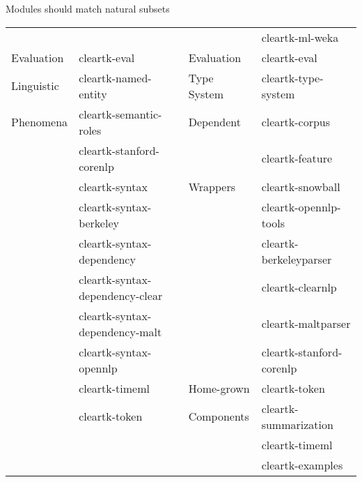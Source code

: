 \documentclass[final]{beamer}
\begin{document}
\begin{frame}[fragile]
\begin{columns}[t]
\begin{column}{.45\linewidth}
\begin{block}{Modules should match natural subsets}
{\begin{tabular*}{.90\linewidth}{ll|ll}
                                     &                           &                 & cleartk-ml-weka \\
                    \cline{1-4}
                    Evaluation       & cleartk-eval              & Evaluation      & cleartk-eval \\
                    \cline{1-4}
                    Linguistic       & cleartk-named-entity  & Type System & cleartk-type-system \\
                    Phenomena            & cleartk-semantic-roles & Dependent  & cleartk-corpus \\
                                         & cleartk-stanford-corenlp &                    & cleartk-feature\\
                                        \cline{3-4}
                                         & cleartk-syntax           & Wrappers & cleartk-snowball \\
                                         & cleartk-syntax-berkeley  &                    & cleartk-opennlp-tools \\
                                         & cleartk-syntax-dependency &                   & cleartk-berkeleyparser\\
                                         & cleartk-syntax-dependency-clear &             & cleartk-clearnlp\\
                                         & cleartk-syntax-dependency-malt &              & cleartk-maltparser\\
                                         & cleartk-syntax-opennlp &                      & cleartk-stanford-corenlp\\
                                        \cline{3-4}
                                         & cleartk-timeml         & Home-grown & cleartk-token \\
                                         & cleartk-token          & Components            & cleartk-summarization\\
                                         &                        &                       & cleartk-timeml \\
                                         &                        &                       & cleartk-examples \\
                    \cline{1-4}
            \end{tabular*}
            }


    \end{block}


\end{column}
\end{columns}
\end{frame}
\end{document}
